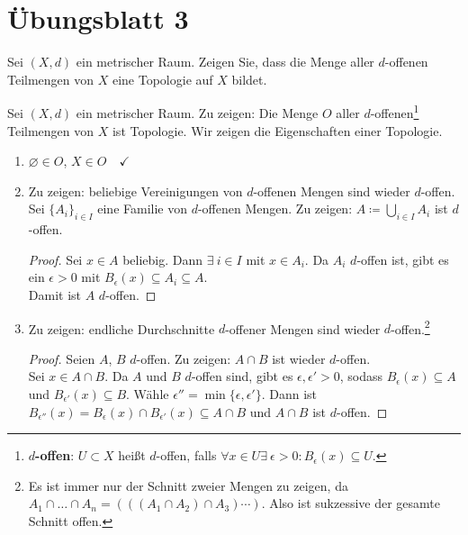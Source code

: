 % 
\newpage
\section{Übungsblatt 3}
\setcounter{problemcounter}{0}

\begin{assignment}
  Sei \( (X,d) \) ein metrischer Raum. Zeigen Sie, dass die Menge aller \( d \)-offenen Teilmengen von \( X \) eine Topologie auf \( X \) bildet.
\end{assignment}
\begin{solution}
  Sei \( (X, d) \) ein metrischer Raum. Zu zeigen: Die Menge \( O \) aller \( d \)-offenen\footnote{\textbf{ \( d \)-offen}: \( U \subset X \) heißt \( d \)-offen, falls \( \forall x \in U \exists \ \epsilon > 0 : B_\epsilon(x) \subseteq U \).} Teilmengen von \( X \) ist Topologie. Wir zeigen die Eigenschaften einer Topologie.
  \begin{enumerate}
    \item \( \varnothing \in O \), \( X \in O \quad \checkmark \)
    \item Zu zeigen: beliebige Vereinigungen von \( d \)-offenen Mengen sind wieder \( d \)-offen. \\
    Sei \( {\{ A_i \}}_{i \in I} \) eine Familie von \( d \)-offenen Mengen. Zu zeigen: \( A \coloneqq \bigcup_{i \in I}A_i \) ist \( d \)-offen.
    \begin{proof}
      Sei \( x \in A \) beliebig. Dann \( \exists \ i \in I \) mit \( x \in A_i \). Da \( A_i \) \( d \)-offen ist, gibt es ein \( \epsilon > 0 \) mit \( B_\epsilon(x) \subseteq A_i \subseteq A \). \\
      Damit ist \( A \) \( d \)-offen.
    \end{proof}
    
    \item Zu zeigen: endliche Durchschnitte \( d \)-offener Mengen sind wieder \( d \)-offen.\footnote{Es ist immer nur der Schnitt zweier Mengen zu zeigen, da \( A_1 \cap \dots \cap A_n = \left(\left(\left( A_1 \cap A_2 \right) \cap A_3 \right) \cdots \right) \). Also ist sukzessive der gesamte Schnitt offen.}
    \begin{proof}
      Seien \( A \), \( B \) \( d \)-offen. Zu zeigen: \( A \cap B \) ist wieder \( d \)-offen. \\
      Sei \( x \in A \cap B \). Da \( A \) und \( B \) \( d \)-offen sind, gibt es \( \epsilon, \epsilon' > 0 \), sodass \( B_\epsilon(x) \subseteq A \) und \( B_{\epsilon'}(x) \subseteq B \). Wähle \( \epsilon'' = \min \{ \epsilon, \epsilon' \} \). Dann ist \( B_{\epsilon''}(x) = B_\epsilon(x) \cap B_{\epsilon'}(x) \subseteq A \cap B \) und \( A \cap B \) ist \( d \)-offen.
    \end{proof}
  \end{enumerate}
\end{solution}

